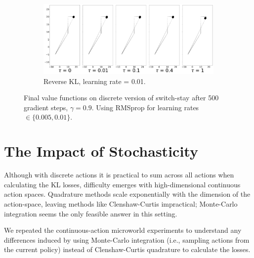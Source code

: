\documentclass[\main/thesis.tex]{subfiles}
\begin{document}
\begin{figure}[!htb]
  \begin{subfigure}[b]{0.85\linewidth}
        \centering
        \includegraphics[width=0.8\columnwidth]{figs/switch-stay/notlearnQ/polytope_reverse_optim=rmsprop_lr=[0.01].png}
        \caption{Reverse KL, learning rate = 0.01.}
        \label{fig:discrete-switch-stay-reverse-adam0.01}
  \end{subfigure}
  \caption{Final value functions on discrete version of switch-stay after 500 gradient steps, $\gamma = 0.9$. Using RMSprop for learning rates $\in \{0.005, 0.01\}$.}
  \label{fig:discrete-ss-all}
\end{figure}


\section{The Impact of Stochasticity}\label{sec:stochastic-microworld}
Although with discrete actions it is practical to sum across all actions when calculating the KL losses, difficulty emerges with high-dimensional continuous action spaces. Quadrature methods scale exponentially with the dimension of the action-space, leaving methods like Clenshaw-Curtis impractical; Monte-Carlo integration seems the only feasible answer in this setting. 

We repeated the continuous-action microworld experiments to understand any differences induced by using Monte-Carlo integration (i.e., sampling actions from the current policy) instead of Clenshaw-Curtis quadrature to calculate the losses. 
\end{document}
